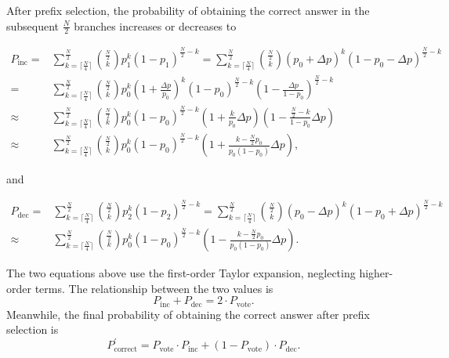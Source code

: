 After prefix selection, the probability of obtaining the correct answer in the subsequent $\frac{N}{2}$ branches increases or decreases to
{
\begin{scriptsize}
\begin{equation}
    \begin{aligned}\label{eq:p_inc}
        P_{\text{inc}} =&\sum_{k=\lceil\frac{N}{4}\rceil}^{\frac{N}{2}}\binom{\frac{N}{2}}{k}p_1^k(1-p_1)^{\frac{N}{2}-k} 
          = \sum_{k=\lceil\frac{N}{4}\rceil}^{\frac{N}{2}}\binom{\frac{N}{2}}{k}(p_0 + \Delta p)^k(1-p_0-\Delta p)^{\frac{N}{2}-k} \\
         = &\sum_{k=\lceil\frac{N}{4}\rceil}^{\frac{N}{2}}\binom{\frac{N}{2}}{k}p_0^k\left(1+\frac{\Delta p}{p_0}\right)^k(1-p_0)^{\frac{N}{2}-k}\left(1-\frac{\Delta p}{1-p_0}\right)^{\frac{N}{2} - k} \\
        \approx &  \sum_{k=\lceil\frac{N}{4}\rceil}^{\frac{N}{2}}\binom{\frac{N}{2}}{k}p_0^k(1-p_0)^{\frac{N}{2}-k}\left(1+\frac{k}{p_0}\Delta p\right)\left(1-\frac{\frac{N}{2}-k}{1-p_0}\Delta p\right) \\
        \approx & \sum_{k=\lceil\frac{N}{4}\rceil}^{\frac{N}{2}}\binom{\frac{N}{2}}{k}p_0^k(1-p_0)^{\frac{N}{2}-k}\left(1+\frac{k-\frac{N}{2}p_0}{p_0(1-p_0)}\Delta p\right),
\end{aligned}
\end{equation}
\end{scriptsize}
}
and
\begin{scriptsize}
\begin{equation}\label{eq:p_dec}
    \begin{aligned}
        P_{\text{dec}}= & \sum_{k=\lceil\frac{N}{4}\rceil}^{\frac{N}{2}}\binom{\frac{N}{2}}{k}p_2^k(1-p_2)^{\frac{N}{2}-k}
        = \sum_{k=\lceil\frac{N}{4}\rceil}^{\frac{N}{2}}\binom{\frac{N}{2}}{k}(p_0 - \Delta p)^k(1-p_0 + \Delta p)^{\frac{N}{2}-k} \\
        \approx & \sum_{k=\lceil\frac{N}{4}\rceil}^{\frac{N}{2}}\binom{\frac{N}{2}}{k}p_0^k(1-p_0)^{\frac{N}{2}-k}\left(1-\frac{k-\frac{N}{2}p_0}{p_0(1-p_0)}\Delta p\right).
    \end{aligned}
\end{equation}
\end{scriptsize}

The two equations above use the first-order Taylor expansion, neglecting higher-order terms. The relationship between the two values is
\begin{equation} \label{eq:prove}
    P_{\text{inc}}+P_{\text{dec}}=2\cdot P_{\text{vote}}.
\end{equation}
Meanwhile, the final probability of obtaining the correct answer after prefix selection is
\begin{equation}
    P_\text{{correct}}^{\prime} = P_{\text{vote}}\cdot P_{\text{inc}} + (1 - P_{\text{vote}})\cdot P_{\text{dec}}.
\end{equation}

